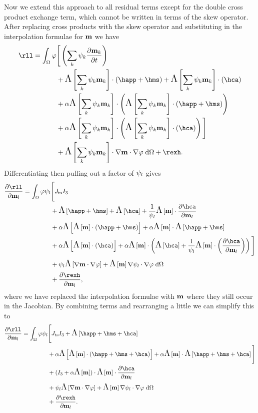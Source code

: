 Now we extend this approach to all residual terms except for the double cross product exchange term, which cannot be written in terms of the skew operator.
After replacing cross products with the skew operator and substituting in the interpolation formulae for $\mathbf{m}$ we have
\begin{equation}
  \begin{aligned}
    \rll = \int_\magd \tbf &\Bigg[ \left( \sum_\ibasisc \sk \pd{\mv_\ibasisc}{t} \right)
      \\
      & + \crossop{\intp{\mv}}{\happ + \hms} + \crossop{\intp{\mv}}{\hca}
      \\
      &+ \dampc \crossop{\intp{\mv}}{\crossop{\intp{\mv}}{\happ + \hms}}
      \\
      &+ \dampc \crossop{\intp{\mv}}{\crossop{\intp{\mv}}{\hca}} \Bigg] \\
    &+ \skewm{\intp{\mv}} \cdot \nabla \mv \cdot \nabla \tbf \d\magd
    + \rexh.
  \end{aligned}
\end{equation}
Differentiating then pulling out a factor of $\psi_l$ gives
\begin{equation}
  \begin{aligned}
    \pd{\rll}{\mv_l} =  \int_\magd \tbf \sbf_l &\Bigg[
      \dtsdml I_3
      \\
      &+ \skewm{\happ + \hms} + \skewm{\hca} + \frac{1}{\sbf_l} \skewm{\mv} \cdot \pd{\hca}{\mv_l}
      \\
      &+ \dampc \skewm{\crossop{\mv}{\happ + \hms}}
      + \dampc \skewm{\mv} \cdot \skewm{\happ + \hms}
      \\
      &+ \dampc \skewm{\crossop{\mv}{\hca}}
      + \dampc \crossop{\mv}{\skewm{\hca} + \frac{1}{\sbf_l}\crossop{\mv}{\pd{\hca}{\mv_l}}}
      \Bigg]
    \\
    &+ \sbf_l \skewm{\nabla \mv \cdot \nabla \tbf}
    + \skewm{\mv} \nabla \sbf_l \cdot \nabla \tbf \d\magd
    \\
    &+ \pd{\rexh}{\mv_l},
  \end{aligned}
\end{equation}
where we have replaced the interpolation formulae with $\mathbf{m}$ where they still occur in the Jacobian.
By combining terms and rearranging a little we can simplify this to
\begin{equation}
  \begin{aligned}
    \pd{\rll}{\mv_l} =  \int_\magd \tbf \sbf_l &\Bigg[
      \dtsdml I_3
      + \skewm{\happ + \hms + \hca}
      \\
      &+ \dampc \skewm{ \crossop{\mv}{\happ + \hms + \hca}}
      + \dampc \skewm{\mv} \cdot \skewm{\happ + \hms + \hca}
      \Bigg]
    \\
    &+ (I_3 + \dampc \skewm{\mv}) \cdot \skewm{\mv} \cdot \pd{\hca}{\mv_l}
    \\
    &+ \sbf_l \skewm{\nabla \mv \cdot \nabla \tbf}
    + \skewm{\mv} \nabla \sbf_l \cdot \nabla \tbf \d\magd
    \\
    &+ \pd{\rexh}{\mv_l}.
  \end{aligned}
\end{equation}

